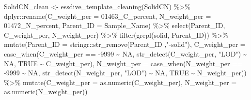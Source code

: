 \documentclass[
]{article}
\newenvironment{Shaded}{\begin{snugshade}}{\end{snugshade}}
\newcommand{\AttributeTok}[1]{\textcolor[rgb]{0.77,0.63,0.00}{#1}}
\newcommand{\ConstantTok}[1]{\textcolor[rgb]{0.00,0.00,0.00}{#1}}
\newcommand{\DecValTok}[1]{\textcolor[rgb]{0.00,0.00,0.81}{#1}}
\newcommand{\FunctionTok}[1]{\textcolor[rgb]{0.00,0.00,0.00}{#1}}
\newcommand{\NormalTok}[1]{#1}
\newcommand{\OtherTok}[1]{\textcolor[rgb]{0.56,0.35,0.01}{#1}}
\newcommand{\SpecialCharTok}[1]{\textcolor[rgb]{0.00,0.00,0.00}{#1}}
\newcommand{\StringTok}[1]{\textcolor[rgb]{0.31,0.60,0.02}{#1}}
\begin{document}
\begin{Shaded}
\begin{Highlighting}[]
\NormalTok{SolidCN\_clean }\OtherTok{\textless{}{-}} \FunctionTok{essdive\_template\_cleaning}\NormalTok{(SolidCN) }\SpecialCharTok{\%\textgreater{}\%}
\NormalTok{  dplyr}\SpecialCharTok{::}\FunctionTok{rename}\NormalTok{(}\AttributeTok{C\_weight\_per =} \StringTok{\textasciigrave{}}\AttributeTok{01463\_C\_percent}\StringTok{\textasciigrave{}}\NormalTok{,}
         \AttributeTok{N\_weight\_per =} \StringTok{\textasciigrave{}}\AttributeTok{01472\_N\_percent}\StringTok{\textasciigrave{}}\NormalTok{,}
         \AttributeTok{Parent\_ID =}\NormalTok{ Sample\_Name) }\SpecialCharTok{\%\textgreater{}\%}
  \FunctionTok{select}\NormalTok{(Parent\_ID, C\_weight\_per,  N\_weight\_per) }\SpecialCharTok{\%\textgreater{}\%}
  \FunctionTok{filter}\NormalTok{(}\FunctionTok{grepl}\NormalTok{(}\StringTok{\textquotesingle{}solid\textquotesingle{}}\NormalTok{, Parent\_ID)) }\SpecialCharTok{\%\textgreater{}\%}
  \FunctionTok{mutate}\NormalTok{(}\AttributeTok{Parent\_ID =}\NormalTok{ stringr}\SpecialCharTok{::}\FunctionTok{str\_remove}\NormalTok{(Parent\_ID ,}\StringTok{"{-}solid"}\NormalTok{),}
         \AttributeTok{C\_weight\_per =} \FunctionTok{case\_when}\NormalTok{(C\_weight\_per }\SpecialCharTok{==} \SpecialCharTok{{-}}\DecValTok{9999} \SpecialCharTok{\textasciitilde{}} \ConstantTok{NA}\NormalTok{,}
                                  \FunctionTok{str\_detect}\NormalTok{(C\_weight\_per, }\StringTok{"LOD"}\NormalTok{) }\SpecialCharTok{\textasciitilde{}} \ConstantTok{NA}\NormalTok{,}
                                     \ConstantTok{TRUE} \SpecialCharTok{\textasciitilde{}}\NormalTok{ C\_weight\_per),}
         \AttributeTok{N\_weight\_per =} \FunctionTok{case\_when}\NormalTok{(N\_weight\_per }\SpecialCharTok{==} \SpecialCharTok{{-}}\DecValTok{9999} \SpecialCharTok{\textasciitilde{}} \ConstantTok{NA}\NormalTok{,}
                                   \FunctionTok{str\_detect}\NormalTok{(N\_weight\_per, }\StringTok{"LOD"}\NormalTok{) }\SpecialCharTok{\textasciitilde{}} \ConstantTok{NA}\NormalTok{,}
                                   \ConstantTok{TRUE} \SpecialCharTok{\textasciitilde{}}\NormalTok{ N\_weight\_per)) }\SpecialCharTok{\%\textgreater{}\%}
   \FunctionTok{mutate}\NormalTok{(}\AttributeTok{C\_weight\_per =} \FunctionTok{as.numeric}\NormalTok{(C\_weight\_per),}
         \AttributeTok{N\_weight\_per =} \FunctionTok{as.numeric}\NormalTok{(N\_weight\_per))}


\end{Highlighting}
\end{Shaded}
\end{document}
